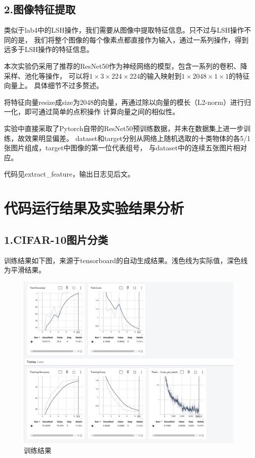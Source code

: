 \documentclass{article}
\begin{document}
\subsection{2.图像特征提取}

    类似于lab4中的LSH操作，我们需要从图像中提取特征信息。只不过与LSH操作不同的是，
    我们将整个图像的每个像素点都直接作为输入，通过一系列操作，得到远多于LSH操作的特征信息。

    本次实验仍采用了推荐的ResNet50作为神经网络的模型，包含一系列的卷积、降采样、池化等操作，
    可以将\(1 \times 3 \times 224 \times 224\)的输入映射到\(1 \times 2048 \times 1 \times 1\)的特征向量上。
    具体细节不过多赘述。

    将特征向量resize成size为2048的向量，再通过除以向量的模长（L2-norm）进行归一化，即可通过简单的点积操作
    计算向量之间的相似性。

    实验中直接采取了Pytorch自带的ResNet50预训练数据，并未在数据集上进一步训练，故效果明显偏差。
    dataset和target分别从网络上随机选取的十类物体的各5/1张图片组成，target中图像的第一位代表组号，
    与dataset中的连续五张图片相对应。

    代码见extract_feature，输出日志见后文。

\section{代码运行结果及实验结果分析}

\subsection{1.CIFAR-10图片分类}

    训练结果如下图，来源于tensorboard的自动生成结果。浅色线为实际值，深色线为平滑结果。

\newpage

\begin{figure}[h]
\centering
\includegraphics[width=1\textwidth]{./Pytorch/res}
\caption{训练结果}
\end{figure}
\end{document}
